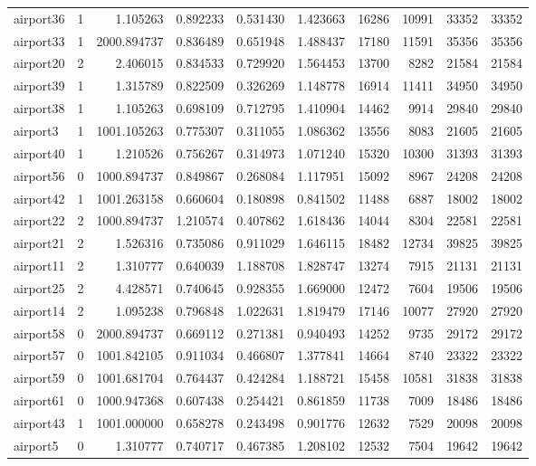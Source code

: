\begin{longtable}{|l|r|r|r|r|r|r|r|r|r|}
airport36 & 1 & 1.105263 & 0.892233 & 0.531430 & 1.423663 & 16286 & 10991 & 33352 & 33352 \\
airport33 & 1 & 2000.894737 & 0.836489 & 0.651948 & 1.488437 & 17180 & 11591 & 35356 & 35356 \\
airport20 & 2 & 2.406015 & 0.834533 & 0.729920 & 1.564453 & 13700 & 8282 & 21584 & 21584 \\
airport39 & 1 & 1.315789 & 0.822509 & 0.326269 & 1.148778 & 16914 & 11411 & 34950 & 34950 \\
airport38 & 1 & 1.105263 & 0.698109 & 0.712795 & 1.410904 & 14462 & 9914 & 29840 & 29840 \\
airport3 & 1 & 1001.105263 & 0.775307 & 0.311055 & 1.086362 & 13556 & 8083 & 21605 & 21605 \\
airport40 & 1 & 1.210526 & 0.756267 & 0.314973 & 1.071240 & 15320 & 10300 & 31393 & 31393 \\
airport56 & 0 & 1000.894737 & 0.849867 & 0.268084 & 1.117951 & 15092 & 8967 & 24208 & 24208 \\
airport42 & 1 & 1001.263158 & 0.660604 & 0.180898 & 0.841502 & 11488 & 6887 & 18002 & 18002 \\
airport22 & 2 & 1000.894737 & 1.210574 & 0.407862 & 1.618436 & 14044 & 8304 & 22581 & 22581 \\
airport21 & 2 & 1.526316 & 0.735086 & 0.911029 & 1.646115 & 18482 & 12734 & 39825 & 39825 \\
airport11 & 2 & 1.310777 & 0.640039 & 1.188708 & 1.828747 & 13274 & 7915 & 21131 & 21131 \\
airport25 & 2 & 4.428571 & 0.740645 & 0.928355 & 1.669000 & 12472 & 7604 & 19506 & 19506 \\
airport14 & 2 & 1.095238 & 0.796848 & 1.022631 & 1.819479 & 17146 & 10077 & 27920 & 27920 \\
airport58 & 0 & 2000.894737 & 0.669112 & 0.271381 & 0.940493 & 14252 & 9735 & 29172 & 29172 \\
airport57 & 0 & 1001.842105 & 0.911034 & 0.466807 & 1.377841 & 14664 & 8740 & 23322 & 23322 \\
airport59 & 0 & 1001.681704 & 0.764437 & 0.424284 & 1.188721 & 15458 & 10581 & 31838 & 31838 \\
airport61 & 0 & 1000.947368 & 0.607438 & 0.254421 & 0.861859 & 11738 & 7009 & 18486 & 18486 \\
airport43 & 1 & 1001.000000 & 0.658278 & 0.243498 & 0.901776 & 12632 & 7529 & 20098 & 20098 \\
airport5 & 0 & 1.310777 & 0.740717 & 0.467385 & 1.208102 & 12532 & 7504 & 19642 & 19642 \\

\end{longtable}
